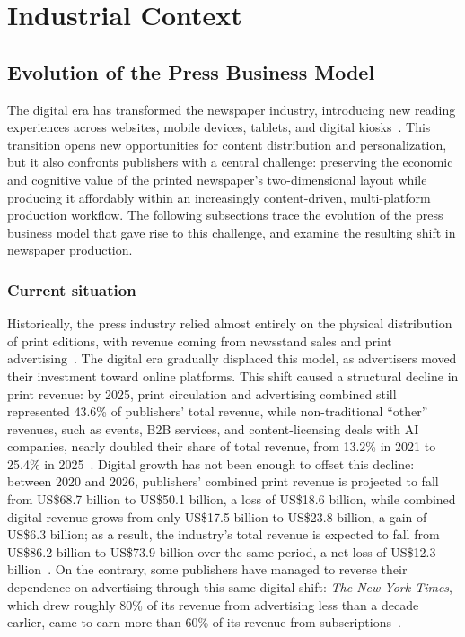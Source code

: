 \chapter{Industrial Context}
\label{chapter:context}



\section{Evolution of the Press Business Model}
\label{section:newspaper-design}

The digital era has transformed the newspaper industry, introducing new reading experiences across websites, mobile devices, tablets, and digital kiosks~\cite{mitchell-modern-news-consumer-2016, wolf-mobile-news-2015, nozal-newspaper-apps-2020}. This transition opens new opportunities for content distribution and personalization, but it also confronts publishers with a central challenge: preserving the economic and cognitive value of the printed newspaper's two-dimensional layout while producing it affordably within an increasingly content-driven, multi-platform production workflow. The following subsections trace the evolution of the press business model that gave rise to this challenge, and examine the resulting shift in newspaper production.

\subsection{Current situation}

Historically, the press industry relied almost entirely on the physical distribution of print editions, with revenue coming from newsstand sales and print advertising~\cite{picard-free-distribution-2001}. The digital era gradually displaced this model, as advertisers moved their investment toward online platforms. This shift caused a structural decline in print revenue: by 2025, print circulation and advertising combined still represented 43.6\% of publishers' total revenue, while non-traditional ``other'' revenues, such as events, B2B services, and content-licensing deals with AI companies, nearly doubled their share of total revenue, from 13.2\% in 2021 to 25.4\% in 2025~\cite{radcliffe-wan-ifra-2025-2026}. Digital growth has not been enough to offset this decline: between 2020 and 2026, publishers' combined print revenue is projected to fall from US\$68.7 billion to US\$50.1 billion, a loss of US\$18.6 billion, while combined digital revenue grows from only US\$17.5 billion to US\$23.8 billion, a gain of US\$6.3 billion; as a result, the industry's total revenue is expected to fall from US\$86.2 billion to US\$73.9 billion over the same period, a net loss of US\$12.3 billion~\cite{radcliffe-wan-ifra-2025-2026}. On the contrary, some publishers have managed to reverse their dependence on advertising through this same digital shift: \emph{The New York Times}, which drew roughly 80\% of its revenue from advertising less than a decade earlier, came to earn more than 60\% of its revenue from subscriptions~\cite{benson-paywalls-2019}.

